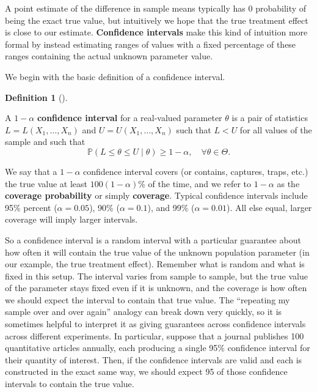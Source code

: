 \documentclass[
  letterpaper,
  DIV=11,
  numbers=noendperiod]{scrreprt}
\renewcommand{\P}{\mathbb{P}}
\theoremstyle{plain}
\theoremstyle{definition}
\theoremstyle{definition}
\newtheorem{definition}{Definition}[chapter]
\theoremstyle{remark}
\begin{document}
A point estimate of the difference in sample means typically has 0
probability of being the exact true value, but intuitively we hope that
the true treatment effect is close to our estimate. \textbf{Confidence
intervals} make this kind of intuition more formal by instead estimating
ranges of values with a fixed percentage of these ranges containing the
actual unknown parameter value.

We begin with the basic definition of a confidence interval.

\begin{definition}[]\protect\hypertarget{def-coverage}{}\label{def-coverage}

A \(1-\alpha\) \textbf{confidence interval} for a real-valued parameter
\(\theta\) is a pair of statistics \(L= L(X_1, \ldots, X_n)\) and
\(U = U(X_1, \ldots, X_n)\) such that \(L < U\) for all values of the
sample and such that \[ 
\P(L \leq \theta \leq U \mid \theta) \geq 1-\alpha, \quad \forall \theta \in \Theta.
\]

\end{definition}

We say that a \(1-\alpha\) confidence interval covers (or contains,
captures, traps, etc.) the true value at least \(100(1-\alpha)\%\) of
the time, and we refer to \(1-\alpha\) as the \textbf{coverage
probability} or simply \textbf{coverage}. Typical confidence intervals
include 95\% percent (\(\alpha = 0.05\)), 90\% (\(\alpha = 0.1\)), and
99\% (\(\alpha = 0.01\)). All else equal, larger coverage will imply
larger intervals.

So a confidence interval is a random interval with a particular
guarantee about how often it will contain the true value of the unknown
population parameter (in our example, the true treatment effect).
Remember what is random and what is fixed in this setup. The interval
varies from sample to sample, but the true value of the parameter stays
fixed even if it is unknown, and the coverage is how often we should
expect the interval to contain that true value. The ``repeating my
sample over and over again'' analogy can break down very quickly, so it
is sometimes helpful to interpret it as giving guarantees across
confidence intervals across different experiments. In particular,
suppose that a journal publishes 100 quantitative articles annually,
each producing a single 95\% confidence interval for their quantity of
interest. Then, if the confidence intervals are valid and each is
constructed in the exact same way, we should expect 95 of those
confidence intervals to contain the true value.
\end{document}
